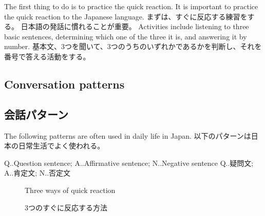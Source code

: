 \documentclass[uplatex,dvipdfmx,b5paper,english,10pt]{jsbook}
\begin{document}
\ifEnglish
The first thing to do is to practice the quick reaction.
It is important to practice the quick reaction to the Japanese language.
\else
まずは、すぐに反応する練習をする。
日本語の発話に慣れることが重要。
\fi
\ifEnglish
Activities include listening to three basic sentences, determining which one of the three it is, and answering it by number.
\else
基本文、3つを聞いて、3つのうちのいずれかであるかを判断し、それを番号で答える活動をする。
\fi

\ifEnglish
\subsection{Conversation patterns}
\else
\subsection{会話パターン}
\fi

\ifEnglish
The following patterns are often used in daily life in Japan.
\else
以下のパターンは日本の日常生活でよく使われる。
\fi

\ifEnglish
Q..Question sentence; A..Affirmative sentence; N..Negative sentence
\else
Q..疑問文; A..肯定文; N..否定文
\fi

\begin{figure}[htbp]
  \begin{center}
    \hspace{0.1\textwidth}
    \hspace{0.1\textwidth}
  \end{center}
\ifEnglish
\caption{Three ways of quick reaction}
\else
\caption{3つのすぐに反応する方法}
\fi
  \label{fig:QuickReaction}
\end{figure}
\end{document}
